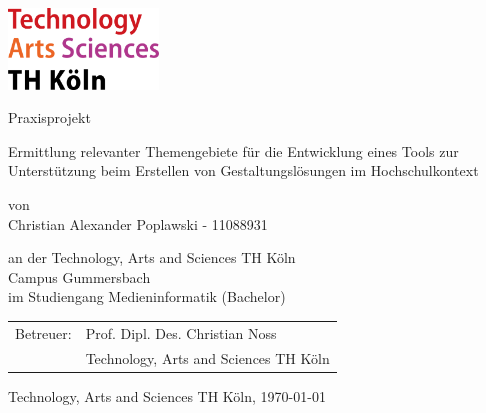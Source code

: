 
\begin{titlepage}

\begin{center}

\includegraphics[width=0.3\textwidth]{images/TH_Koeln_Logo.png}\\

\vspace*{1cm}

\begin{Huge}
Praxisprojekt\\
\end{Huge}

\vspace*{0.5cm}

\begin{LARGE}
Ermittlung relevanter Themengebiete für die Entwicklung eines Tools zur Unterstützung beim Erstellen von Gestaltungslösungen im Hochschulkontext
\end{LARGE}

\vspace*{1.5cm}

\begin{large}
	von\\
    Christian Alexander Poplawski - 11088931\\

\vspace{1.0cm}

	an der Technology, Arts and Sciences TH Köln\\
    Campus Gummersbach\\
    im Studiengang Medieninformatik (Bachelor)\\

\vspace{1.0cm}

    \begin{tabular}{rl}
        Betreuer:  &  Prof. Dipl. Des. Christian Noss\\
       			   &  \small Technology, Arts and Sciences TH Köln \\[1.0em]

	\end{tabular}

\end{large}

\vspace{1.5cm}

Technology, Arts and Sciences TH Köln, \today \\


\vfill
\end{center}

\end{titlepage}
